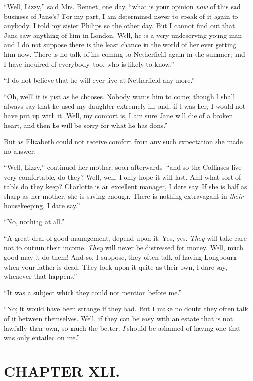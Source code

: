 ``Well, Lizzy,'' said Mrs. Bennet, one day, ``what is your opinion \textit{now} of this sad business of Jane's? For my part, I am determined never to speak of it again to anybody. I told my sister Philips so the other day. But I cannot find out that Jane saw anything of him in London. Well, he is a very undeserving young man---and I do not suppose there is the least chance in the world of her ever getting him now. There is no talk of his coming to Netherfield again in the summer; and I have inquired of everybody, too, who is likely to know.''




``I do not believe that he will ever live at Netherfield any more.''

``Oh, well! it is just as he chooses. Nobody wants him to come; though I shall always say that he used my daughter extremely ill; and, if I was her, I would not have put up with it. Well, my comfort is, I am sure Jane will die of a broken heart, and then he will be sorry for what he has done.''

But as Elizabeth could not receive comfort from any such expectation she made no answer.

``Well, Lizzy,'' continued her mother, soon afterwards, ``and so the Collinses live very comfortable, do they? Well, well, I only hope it will last. And what sort of table do they keep? Charlotte is an excellent manager, I dare say. If she is half as sharp as her mother, she is saving enough. There is nothing extravagant in \textit{their} housekeeping, I dare say.''

``No, nothing at all.''

``A great deal of good management, depend upon it. Yes, yes. \textit{They} will take care not to outrun their income. \textit{They} will never be distressed for money. Well, much good may it do them! And so, I suppose, they often talk of having Longbourn when your father is dead. They look upon it quite as their own, I dare say, whenever that happens.''

``It was a subject which they could not mention before me.''

``No; it would have been strange if they had. But I make no doubt they often talk of it between themselves. Well, if they can be easy with an estate that is not lawfully their own, so much the better. \textit{I} should be ashamed of having one that was only entailed on me.''



\chapter{CHAPTER XLI.}

